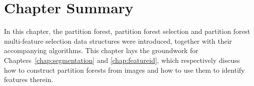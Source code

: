 
\section{Chapter Summary}

In this chapter, the partition forest, partition forest selection and partition forest multi-feature selection data structures were introduced, together with their accompanying algorithms. 
%
\noindent This chapter lays the groundwork for Chapters~\ref{chap:segmentation} and \ref{chap:featureid}, which respectively discuss how to construct partition forests from images and how to use them to identify features therein.